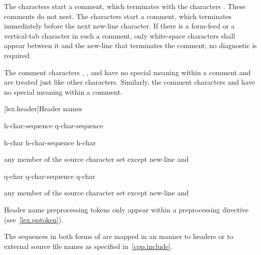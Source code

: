 \pnum
{}%
%
%
The characters \tcode{/*} start a comment, which terminates with the
characters \tcode{*/}. These comments do not nest.
%
The characters \tcode{//} start a comment, which terminates immediately before the
next new-line character. If there is a form-feed or a vertical-tab
character in such a comment, only white-space characters shall appear
between it and the new-line that terminates the comment; no diagnostic
is required. \begin{note} The comment characters \tcode{//}, \tcode{/*},
and \tcode{*/} have no special meaning within a \tcode{//} comment and
are treated just like other characters. Similarly, the comment
characters \tcode{//} and \tcode{/*} have no special meaning within a
\tcode{/*} comment. \end{note}%

[lex.header]{Header names}

%
\begin{bnf}
\br
    \terminal{<} h-char-sequence \terminal{>}\br
     q-char-sequence 
\end{bnf}

\begin{bnf}
\br
    h-char\br
    h-char-sequence h-char
\end{bnf}

\begin{bnf}
\br
    \textnormal{any member of the source character set except new-line and \terminal{>}}
\end{bnf}

\begin{bnf}
\br
    q-char\br
    q-char-sequence q-char
\end{bnf}

\begin{bnf}
\br
    \textnormal{any member of the source character set except new-line and }
\end{bnf}

\pnum
\begin{note} Header name preprocessing tokens only appear within a
 preprocessing directive (see~\ref{lex.pptoken}). \end{note}
The sequences in both forms of  are mapped in an
 manner to headers or to
external source file names as specified in~\ref{cpp.include}.

